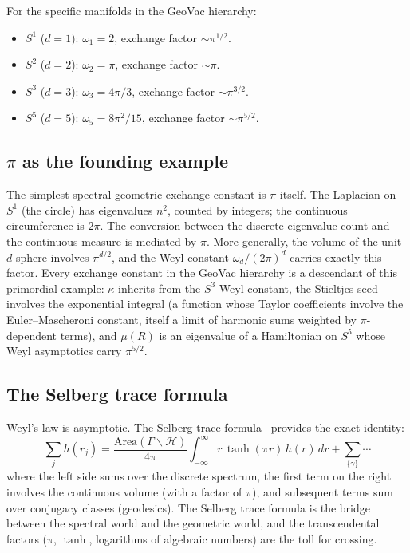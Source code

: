 \documentclass[aps,pra,twocolumn,superscriptaddress,longbibliography]{revtex4-2}
\begin{document}
For the specific manifolds in the GeoVac hierarchy:
\begin{itemize}
  \item $S^1$ ($d = 1$): $\omega_1 = 2$,
    exchange factor $\sim \pi^{1/2}$.
  \item $S^2$ ($d = 2$): $\omega_2 = \pi$,
    exchange factor $\sim \pi$.
  \item $S^3$ ($d = 3$): $\omega_3 = 4\pi/3$,
    exchange factor $\sim \pi^{3/2}$.
  \item $S^5$ ($d = 5$): $\omega_5 = 8\pi^2/15$,
    exchange factor $\sim \pi^{5/2}$.
\end{itemize}

\subsection{$\pi$ as the founding example}

The simplest spectral-geometric exchange constant is $\pi$ itself.
The Laplacian on $S^1$ (the circle) has eigenvalues $n^2$, counted
by integers; the continuous circumference is $2\pi$.  The
conversion between the discrete eigenvalue count and the continuous
measure is mediated by $\pi$.  More generally, the volume of the
unit $d$-sphere involves $\pi^{d/2}$, and the Weyl constant
$\omega_d / (2\pi)^d$ carries exactly this factor.  Every exchange
constant in the GeoVac hierarchy is a descendant of this primordial
example: $\kappa$ inherits from the $S^3$ Weyl constant, the
Stieltjes seed involves the exponential integral (a function whose
Taylor coefficients involve the Euler--Mascheroni constant, itself
a limit of harmonic sums weighted by $\pi$-dependent terms), and
$\mu(R)$ is an eigenvalue of a Hamiltonian on $S^5$ whose Weyl
asymptotics carry $\pi^{5/2}$.

\subsection{The Selberg trace formula}

Weyl's law is asymptotic.  The Selberg trace
formula~\cite{selberg1956} provides the exact identity:
\begin{equation}
  \sum_j h(r_j)
  = \frac{\mathrm{Area}(\Gamma \backslash \mathcal{H})}{4\pi}
    \int_{-\infty}^{\infty} r\,\tanh(\pi r)\,h(r)\,dr
    + \sum_{\{\gamma\}} \cdots
  \label{eq:selberg}
\end{equation}
where the left side sums over the discrete spectrum, the first
term on the right involves the continuous volume (with a factor
of $\pi$), and subsequent terms sum over conjugacy classes
(geodesics).  The Selberg trace formula is the bridge between
the spectral world and the geometric world, and the
transcendental factors ($\pi$, $\tanh$, logarithms of
algebraic numbers) are the toll for crossing.
\end{document}
